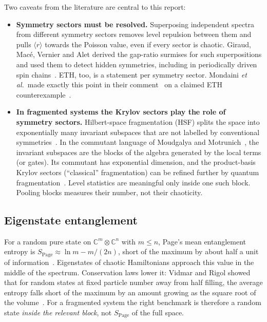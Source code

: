 Two caveats from the literature are central to this report:
\begin{itemize}
\item \textbf{Symmetry sectors must be resolved.} Superposing independent
  spectra from different symmetry sectors removes level repulsion between them
  and pulls $\langle r\rangle$ towards the Poisson value, even if every sector
  is chaotic. Giraud, Mac\'e, Vernier and Alet derived the gap-ratio surmises for
  such superpositions and used them to detect hidden symmetries, including in
  periodically driven spin chains~\cite{giraud2022}. ETH, too, is a statement
  per symmetry sector. Mondaini \emph{et al.}\ made exactly this point in their
  comment~\cite{mondaini2018} on a claimed ETH counterexample~\cite{shiraishi2017}.
\item \textbf{In fragmented systems the Krylov sectors play the role of
  symmetry sectors.} Hilbert-space fragmentation (HSF) splits the space into
  exponentially many invariant subspaces that are not labelled by conventional
  symmetries~\cite{sala2020,khemani2020}. In the commutant language of Moudgalya
  and Motrunich~\cite{moudgalya2022}, the invariant subspaces are the blocks of
  the algebra generated by the local terms (or gates). Its commutant has
  exponential dimension, and the product-basis Krylov sectors (``classical''
  fragmentation) can be refined further by quantum
  fragmentation~\cite{moudgalya2022}. Level statistics are meaningful only
  inside one such block. Pooling blocks measures their number, not their
  chaoticity.
\end{itemize}

\subsection{Eigenstate entanglement}

For a random pure state on $\mathbb{C}^m\otimes\mathbb{C}^n$ with $m\le n$,
Page's mean entanglement entropy is $S_\mathrm{Page}\approx\ln m-m/(2n)$, short
of the maximum by about half a unit of information~\cite{page1993}. Eigenstates
of chaotic Hamiltonians approach this value in the middle of the spectrum.
Conservation laws lower it: Vidmar and Rigol showed that for random states at
fixed particle number away from half filling, the average entropy falls short of
the maximum by an amount growing as the square root of the
volume~\cite{vidmar2017}. For a fragmented system the right benchmark is
therefore a random state \emph{inside the relevant block}, not $S_\mathrm{Page}$
of the full space.

